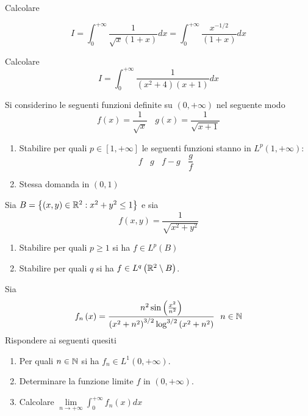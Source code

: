 Calcolare


\begin{equation*}
I = \int ^{ + \infty }_{0}\frac{1}{\sqrt{x}\left(1 + x\right)} dx = \int ^{ + \infty }_{0}\frac{x^{ - 1/2}}{\left(1 + x\right)} dx
\end{equation*}
\Esercizio{}

Calcolare
\begin{equation*}
I = \int ^{ + \infty }_{0}\frac{1}{\left(x^{2} + 4\right)\left(x + 1\right)} dx
\end{equation*}

Si considerino le seguenti funzioni definite su $\left(0, + \infty \right)$ nel seguente modo
\begin{equation*}
f\left(x\right) = \frac{1}{\sqrt{x}} \ \ \ \ g\left(x\right) = \frac{1}{\sqrt{x + 1}}
\end{equation*}
\begin{enumerate}
\item Stabilire per quali $p\in \left[ 1, + \infty \right]$ le seguenti funzioni stanno in $L^{p}\left(1, + \infty \right)$:
\begin{equation*}
f\ \ \ \ g\ \ \ \ f - g\ \ \ \ \frac{g}{f}
\end{equation*}
\item Stessa domanda in $\left(0,1\right)$
\end{enumerate}
\Esercizio{ }

Sia $B = \left\{\left(x,y\right) \in \mathbb{R} ^{2} :x^{2} + y^{2} \leq 1\right\}$ e sia
\begin{equation*}
f\left(x,y\right) = \frac{1}{\sqrt{x^{2} + y^{2}}}
\end{equation*}
\begin{enumerate}
\item Stabilire per quali $p\geq 1$ si ha $f\in L^{p}\left(B\right)$
\item Stabilire per quali $q$ si ha $f\in L^{q}\left(\mathbb{R} ^{2} \setminus B\right)$.
\end{enumerate}
\Esercizio{}

Sia
\begin{equation*}
f_{n}\left(x\right) = \frac{n^{2}\sin\left(\frac{x^{2}}{n^{2}}\right)}{\left(x^{2} + n^{2}\right)^{3/2}\log^{3/2}\left(x^{2} + n^{2}\right)} \ \ n\in \mathbb{N} 
\end{equation*}
Rispondere ai seguenti quesiti
\begin{enumerate}
\item Per quali $n\in \mathbb{N} $ si ha $f_{n} \in L^{1}\left(0, + \infty \right)$.
\item Determinare la funzione limite $f$ in $\left(0, + \infty \right)$.
\item Calcolare $\lim\limits _{n\rightarrow + \infty }\int ^{ + \infty }_{0} f_{n}\left(x\right) dx$
\end{enumerate}
\Esercizio{}

